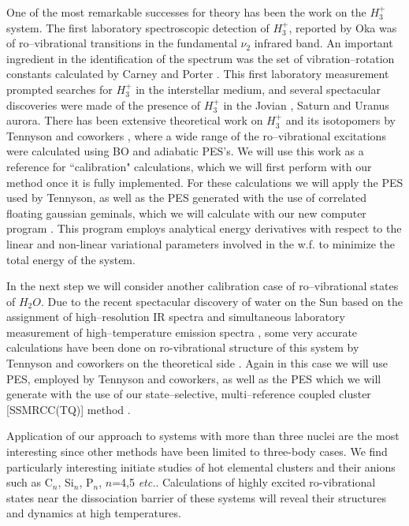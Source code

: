 One of the most remarkable successes
for theory has been the work on the $H_3^{+}$
system. The first laboratory spectroscopic detection of  $H_3^{+}$,
reported by Oka \cite{ref:k35} was of ro--vibrational transitions in the
fundamental $\nu_2$ infrared band. An important ingredient in the
identification of the spectrum was the set of vibration--rotation
constants calculated by Carney and Porter \cite{ref:k36}. This first
laboratory measurement prompted searches for $H_3^{+}$ in the interstellar
medium, and several spectacular discoveries were made of the presence
of $H_3^{+}$ in the Jovian \cite{ref:k41}, Saturn \cite{ref:k44} and
Uranus \cite{ref:k45} aurora. There has been 
extensive theoretical
work on $H_3^{+}$ and its isotopomers by Tennyson and coworkers
\cite{ref:ten2,ref:ten3,ref:ten4,ref:ten5,ref:ten6,ref:ten7,ref:ten8,%
ref:ten9}, where a wide range of the ro--vibrational excitations were
calculated using BO and adiabatic PES's. We will use this 
work as a reference for ``calibration" calculations, which we will
first perform with our method once it is fully implemented. 
For these calculations we will apply the PES used by Tennyson, as well as
the PES generated with the use of correlated floating gaussian
geminals, which we will calculate with our new computer 
program \cite{A38}. This program employs analytical 
energy derivatives
with respect to the linear and non-linear 
variational parameters involved in the w.f. 
to minimize the total energy of the system.

In the next step we will consider another calibration case 
of ro--vibrational states of $H_2O$.
Due to the recent spectacular discovery of water on the Sun based
on the assignment of high--resolution IR spectra and simultaneous
laboratory measurement of high--temperature emission spectra 
\cite{ref:bern1}, 
some very accurate calculations have been done on 
ro-vibrational structure of this system
by Tennyson and coworkers
on the theoretical side \cite{ref:ten10,ref:ten11,ref:ten12,%
ref:ten13,ref:ten14}. Again in this case we will use PES, employed
by Tennyson and coworkers, as well as the PES which we will 
generate with the use of our state--selective, multi--reference
coupled cluster [SSMRCC(TQ)] method 
\cite{A1,A4,A11,A17,A22,A25}.


Application of our approach to systems with more than three
nuclei are the most interesting since 
other methods have been limited to three-body cases.
We find particularly interesting initiate studies
of hot elemental clusters and their anions such as
C$_n$, Si$_n$, P$_n$, $n$=4,5 {\it etc.}.
Calculations of highly excited ro-vibrational states near the
dissociation barrier of
these systems will reveal their structures and dynamics 
at high temperatures.

